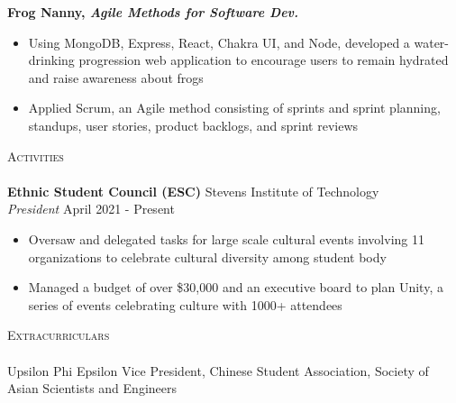 \documentclass[10pt]{article}
\newcommand{\lineunder} {
    \vspace*{-8pt} \\
    \hspace*{-18pt} \hrulefill \\
}
\newcommand{\header} [1] {
    {\hspace*{-18pt}\vspace*{6pt} \textsc{#1}}
    \vspace*{-6pt} \lineunder
}
\begin{document}
\textbf{Frog Nanny, \textit{Agile Methods for Software Dev.}} 
\begin{itemize}[noitemsep, topsep=0.5pt, parsep=0pt,partopsep=0pt]
    \item Using MongoDB, Express, React, Chakra UI, and Node, developed a water-drinking progression web application to encourage users to remain hydrated and raise awareness about frogs
    \item Applied Scrum, an Agile method consisting of sprints and sprint planning, standups, user stories, product backlogs, and sprint reviews
\end{itemize}
\vspace{2mm}
\header{Activities}
\textbf{Ethnic Student Council (ESC)} \hfill Stevens Institute of Technology\\
\textit{President} \hfill April 2021 - Present\\
\vspace{-1mm}
\begin{itemize}[noitemsep,parsep=0pt,partopsep=0pt]
    \item Oversaw and delegated tasks for large scale cultural events involving 11 organizations to celebrate cultural diversity among student body
    \item Managed a budget of over \$30,000 and an executive board to plan Unity, a series of events celebrating culture with 1000+ attendees 
\end{itemize}
\vspace{2mm}
\header{Extracurriculars}
Upsilon Phi Epsilon Vice President, Chinese Student Association, Society of Asian Scientists and Engineers
\end{document}

